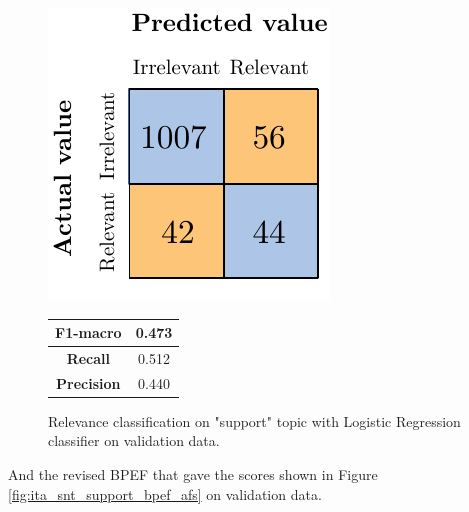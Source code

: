 \begin{figure}[H]
	\begin{minipage}[b]{0.6\linewidth}
		\centering
		\includegraphics[scale=1]{figures/conf_matrices/ita_support/ita_rel_support_logreg_afs.pdf}
	\end{minipage}
	\begin{minipage}[b]{0.3\linewidth}
		\begin{tabular}[b]{ | c | c | } 
			\hline
			\textbf{F1-macro} & 0.473 \\
			\hline
			\textbf{Recall} & 0.512 \\ 
			\hline
			\textbf{Precision} & 0.440 \\ 
			\hline
		\end{tabular}
	\end{minipage}
	\caption{Relevance classification on "support" topic with Logistic Regression classifier on validation data.}
	\label{fig:ita_rel_support_logreg_afs}
\end{figure}

And the revised BPEF that gave the scores shown in Figure \ref{fig:ita_snt_support_bpef_afs} on validation data.


